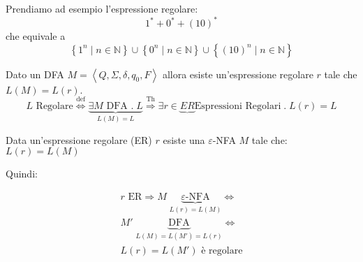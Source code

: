 \documentclass[a4paper]{article}
\begin{document}
\begin{example}
  Prendiamo ad esempio l'espressione regolare:
  \[
    1^* + 0^* + (10)^*
  \] 
  che equivale a
  \[
    \left\{ 1^n \;\left|\; n \in \mathbb{N} \right. \right\} \cup 
    \left\{ 0^n \;\left|\; n \in \mathbb{N} \right. \right\} \cup
    \left\{ (10)^n \;\left|\; n \in \mathbb{N} \right. \right\}
  \] 
\end{example}

\begin{theorem}
  Dato un DFA \( M = \left< Q, \Sigma, \delta, q_0, F \right> \) allora esiste
  un'espressione regolare \( r \) tale che \( L(M) = L(r) \).
  \[
    L \text{ Regolare} \stackrel{\text{def}}{\iff}
    \underbrace{\exists M \text{ DFA }.\; L}_{L(M) = L}
    \stackrel{\text{Th}}{\Rightarrow} \exists r \in \underbrace{ER}{\text{Espressioni Regolari}} \;.\; L(r) = L
  \] 
\end{theorem}
\begin{theorem}
  Data un'espressione regolare (ER) \( r \) esiste una \( \varepsilon \)-NFA \( M \)
  tale che: \( L(r) = L(M) \) 

  \vspace{1em}
  \noindent
  Quindi:
  \begin{figure}[H]
    \centering
  \end{figure}
  \begin{figure}[H]
    \centering
  \end{figure}

  \[
    \begin{aligned}
      r \text{ ER} \Rightarrow M \; \underbrace{\varepsilon\text{-NFA}}_{L(r) = L(M)} \iff\\
      M' \; \underbrace{\text{DFA}}_{L(M) = L(M') = L(r)} \iff\\
      L(r) = L(M') \text{ è regolare}
    \end{aligned}
  \] 
\end{theorem}
\end{document}
